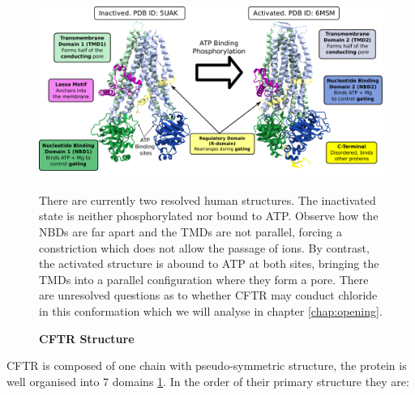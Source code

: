 \begin{figure}
	\begin{center}
	\includegraphics[width=\textwidth]{figures/CFTR_structure.pdf}
	\end{center}
	\label{CFTR_structure_domains}
	\captionsetup{singlelinecheck = false, justification=raggedright}
	\caption[CFTR Structure] {\textbf{CFTR Structure}}{There are currently two resolved human structures. The inactivated state is neither phosphorylated nor bound to ATP. Observe how the NBDs are far apart and the TMDs are not parallel, forcing a constriction which does not allow the passage of ions. By contrast, the activated structure is abound to ATP at both sites, bringing the TMDs into a parallel configuration where they form a pore. There are unresolved questions as to whether CFTR may conduct chloride in this conformation which we will analyse in chapter \ref{chap:opening}.} 
\end{figure}
CFTR is composed of one chain with pseudo-symmetric structure, the protein is well organised into 7 domains \ref{CFTR_structure_domains}. In the order of their primary structure they are: 
